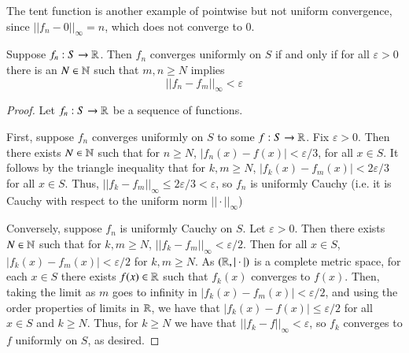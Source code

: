 The tent function is another example of pointwise but not uniform convergence, since $||f_n-0||_{\infty} = n$, which does not converge to $0$. 

\begin{thm}
    Suppose $f_n:S\rightarrow \mathbb R$. Then $f_n$ converges uniformly on $S$ if and only if for all $\varepsilon > 0$ there is an $N \in \mathbb N$ such that $m,n \geq N$ implies $$||f_n - f_m||_{\infty} < \varepsilon$$
\end{thm}
\begin{proof}
    Let $f_n:S\rightarrow \mathbb R$ be a sequence of functions.

    First, suppose $f_n$ converges uniformly on $S$ to some $f:S\rightarrow \mathbb R$. Fix $\varepsilon > 0$. Then there exists $N \in \mathbb N$ such that for $n \geq N$, $|f_n(x) - f(x)| < \varepsilon/3$, for all $x \in S$. It follows by the triangle inequality that for $k,m \geq N$, $|f_k(x) - f_m(x)| < 2\varepsilon/3$ for all $x \in S$. Thus, $||f_k - f_m||_{\infty} \leq 2\varepsilon/3 < \varepsilon$, so $f_n$ is uniformly Cauchy (i.e. it is Cauchy with respect to the uniform norm $||\cdot||_{\infty}$)

    Conversely, suppose $f_n$ is uniformly Cauchy on $S$. Let $\varepsilon > 0$. Then there exists $N \in \mathbb N$ such that for $k,m \geq N$, $||f_k - f_m||_{\infty} < \varepsilon/2$. Then for all $x \in S$, $|f_k(x) - f_m(x)| < \varepsilon/2$ for $k,m \geq N$. As $(\mathbb R, |\cdot|)$ is a complete metric space, for each $x \in S$ there exists $f(x) \in \mathbb R$ such that $f_k(x)$ converges to $f(x)$. Then, taking the limit as $m$ goes to infinity in $|f_k(x) - f_m(x)| < \varepsilon/2$, and using the order properties of limits in $\mathbb R$, we have that $|f_k(x) - f(x)| \leq \varepsilon/2$ for all $x \in S$ and $k \geq N$. Thus, for $k \geq N$ we have that $||f_k - f||_{\infty} < \varepsilon$, so $f_k$ converges to $f$ uniformly on $S$, as desired.
\end{proof}

